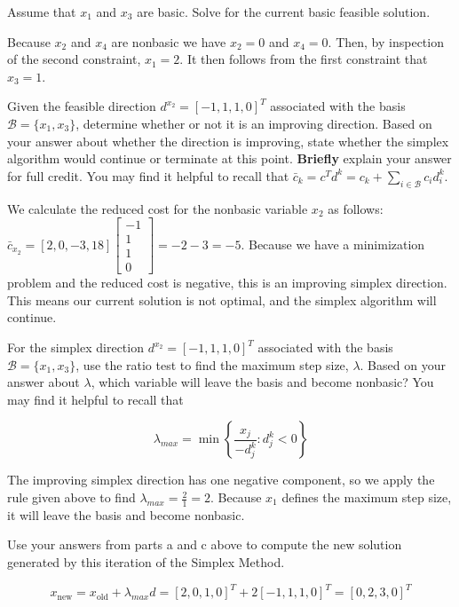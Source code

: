 \begin{parts}
 Assume that $x_1$ and $x_3$ are basic.  Solve for the current basic feasible solution.


\vspace{1cm}

Because $x_2$ and $x_4$ are nonbasic we have $x_2 = 0$ and $x_4 = 0$.  Then, by inspection of the second constraint, $x_1 = 2$.  It then follows from the first constraint that $x_3 = 1$.

\vfill


 Given the feasible direction $d^{x_2} = [-1, 1, 1, 0]^T$ associated with the basis $\mathcal{B} = \{x_1, x_3\}$, determine whether or not it is an improving direction.  Based on your answer about whether the direction is improving, state whether the simplex algorithm would continue or terminate at this point.  {\bf Briefly} explain your answer for full credit.  You may find it helpful to recall that $\bar c_k = c^T d^k = c_k + \sum_{i \in \mathcal{B}} c_i d_i^k$.

We calculate the reduced cost for the nonbasic variable $x_2$ as follows: $\bar c_{x_2} = [2, 0, -3, 18]   \begin{bmatrix}
    -1 \\ 1 \\ 1 \\ 0
  \end{bmatrix} = -2 - 3 = -5$.  Because we have a minimization problem and the reduced cost is negative, this is an improving simplex direction.  This means our current solution is not optimal, and the simplex algorithm will continue.

\vfill

 For the simplex direction $d^{x_2} = [-1, 1, 1, 0]^T$ associated with the basis $\mathcal{B} = \{x_1, x_3\}$, use the ratio test to find the maximum step size, $\lambda$.  Based on your answer about $\lambda$, which variable will leave the basis and become nonbasic?    You may find it helpful to recall that 

\[
\lambda_{max} = \min \left\{ \frac{x_j}{-d_j^k}:d_j^k < 0 \right\}
\]

\vspace{0.5cm}
The improving simplex direction has one negative component, so we apply the rule given above to find $\lambda_{max} = \frac{2}{1} = 2$.  Because $x_1$ defines the maximum step size, it will leave the basis and become nonbasic.  
\vspace{0.5cm}

 Use your answers from parts a and c above to compute the new solution generated by this iteration of the Simplex Method. 

\[
x_{\text{new}} = x_\text{old} + \lambda_{max} d = [2,0,1,0]^T + 2 [-1,1,1,0]^T = [0,2,3,0]^T
\]



\end{parts}

